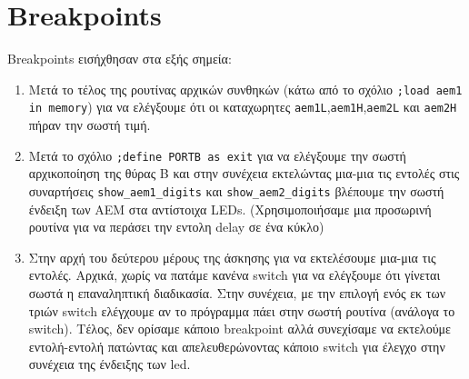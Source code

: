 \chapter{Breakpoints}

Breakpoints εισήχθησαν στα εξής σημεία:
\begin{enumerate}
\item Μετά το τέλος της ρουτίνας αρχικών συνθηκών
(κάτω από το σχόλιο \lstinline[breaklines=true]!;load aem1 in memory!) για να ελέγξουμε ότι οι καταχωρητες
\lstinline!aem1L!,\lstinline!aem1H!,\lstinline!aem2L! και \lstinline!aem2H! πήραν την σωστή τιμή.
\item Μετά το σχόλιο \lstinline[breaklines=true]!;define PORTB as exit! για να ελέγξουμε την σωστή
αρχικοποίηση της θύρας Β και στην συνέχεια εκτελώντας μια-μια τις
εντολές στις συναρτήσεις \lstinline!show_aem1_digits! και \lstinline!show_aem2_digits!
βλέπουμε την σωστή ένδειξη των ΑΕΜ στα αντίστοιχα LEDs.
(Χρησιμοποιήσαμε μια προσωρινή ρουτίνα για να περάσει την εντολη delay σε ένα κύκλο)
\item Στην αρχή του δεύτερου μέρους της άσκησης για να εκτελέσουμε μια-μια τις εντολές. 
Αρχικά, χωρίς να πατάμε κανένα switch για να ελέγξουμε ότι γίνεται σωστά η επαναληπτική διαδικασία.
Στην συνέχεια, με την επιλογή ενός εκ των τριών switch ελέγχουμε αν το πρόγραμμα πάει στην σωστή ρουτίνα (ανάλογα το switch).
Τέλος, δεν ορίσαμε κάποιο breakpoint αλλά συνεχίσαμε να εκτελούμε εντολή-εντολή πατώντας και απελευθερώνοντας κάποιο switch
για έλεγχο στην συνέχεια της ένδειξης των led.
\end{enumerate}